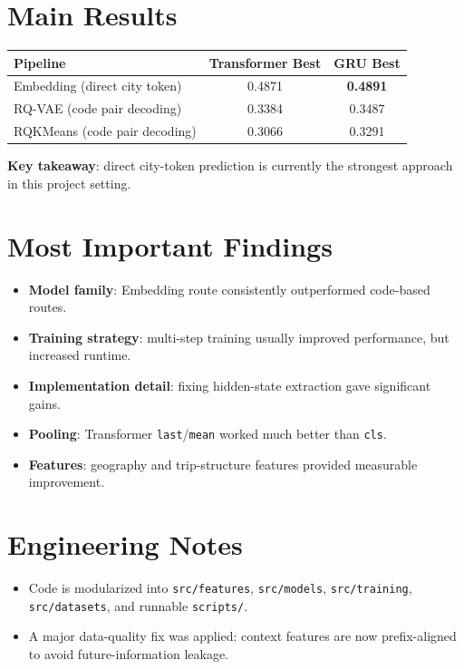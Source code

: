\documentclass[11pt]{article}
\begin{document}
\section*{Main Results}
\begin{table}[h]
\centering
\begin{tabular}{lcc}
\toprule
\textbf{Pipeline} & \textbf{Transformer Best} & \textbf{GRU Best} \\
\midrule
Embedding (direct city token) & 0.4871 & \textbf{0.4891} \\
RQ-VAE (code pair decoding) & 0.3384 & 0.3487 \\
RQKMeans (code pair decoding) & 0.3066 & 0.3291 \\
\bottomrule
\end{tabular}
\end{table}

\textbf{Key takeaway}: direct city-token prediction is currently the strongest approach in this project setting.

\section*{Most Important Findings}
\begin{itemize}[leftmargin=1.5em]
    \item \textbf{Model family}: Embedding route consistently outperformed code-based routes.
    \item \textbf{Training strategy}: multi-step training usually improved performance, but increased runtime.
    \item \textbf{Implementation detail}: fixing hidden-state extraction gave significant gains.
    \item \textbf{Pooling}: Transformer \texttt{last}/\texttt{mean} worked much better than \texttt{cls}.
    \item \textbf{Features}: geography and trip-structure features provided measurable improvement.
\end{itemize}

\section*{Engineering Notes}
\begin{itemize}[leftmargin=1.5em]
    \item Code is modularized into \texttt{src/features}, \texttt{src/models}, \texttt{src/training}, \texttt{src/datasets}, and runnable \texttt{scripts/}.
    \item A major data-quality fix was applied: context features are now prefix-aligned to avoid future-information leakage.
\end{itemize}
\end{document}
